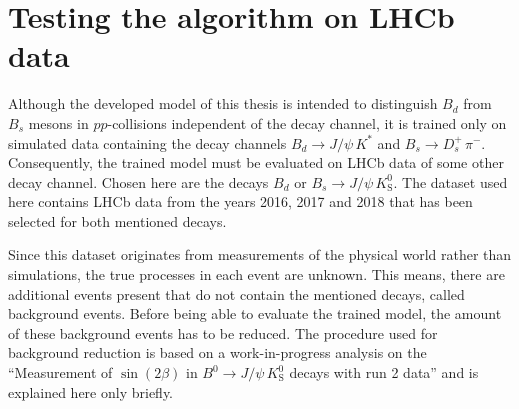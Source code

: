 \section{Testing the algorithm on LHCb data}



Although the developed model of this thesis is intended to distinguish $B_d$ from $B_s$ mesons in $pp$-collisions independent of the decay channel, it is trained only on simulated data containing the decay channels $B_d \rightarrow J/\psi \, K^*$ and $B_s \rightarrow D^+_s \, \pi^-$.
Consequently, the trained model must be evaluated on LHCb data of some other decay channel.
Chosen here are the decays $B_d \text{ or } B_s \rightarrow J/\psi \, K^0_\text{S}$.
The dataset used here contains LHCb data from the years 2016, 2017 and 2018 that has been selected for both mentioned decays. %

Since this dataset originates from measurements of the physical world rather than simulations, the true processes in each event are unknown. %
This means, there are additional events present that do not contain the mentioned decays, called background events.
Before being able to evaluate the trained model, the amount of these background events has to be reduced.
The procedure used for background reduction is based on a work-in-progress analysis on the \enquote{Measurement of $\sin(2\beta)$ in $B^0\rightarrow J/\psi \, K^0_\text{S}$ decays with run 2 data} and is explained here only briefly. %

